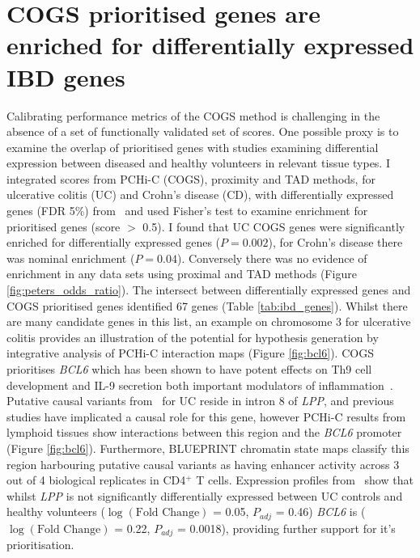 \documentclass[a4paper,11pt]{report}
\begin{document}
\section{COGS prioritised genes are enriched for differentially expressed IBD genes} 
Calibrating performance metrics of the COGS method is challenging in the absence of a set of functionally validated set of scores. One possible proxy is to examine the overlap of prioritised genes with studies examining differential expression between diseased and healthy volunteers in relevant tissue types. I integrated scores from PCHi-C (COGS), proximity and TAD methods, for ulcerative colitis (UC) and Crohn's disease (CD), with differentially expressed genes (FDR 5\%) from~\citet{PetersLyonsLeeEtAl2016} and used Fisher's test to examine enrichment for prioritised genes (score $>$ 0.5). I found that UC COGS genes were significantly enriched for differentially expressed genes ($P = 0.002$), for Crohn's disease there was nominal enrichment ($P = 0.04$). Conversely there was no evidence of enrichment in any data sets using proximal and TAD methods (Figure \ref{fig:peters_odds_ratio}). The intersect between differentially expressed genes and COGS prioritised genes identified 67 genes (Table \ref{tab:ibd_genes}). Whilst there are many candidate genes in this list, an example on chromosome 3 for ulcerative colitis provides an illustration of the potential for hypothesis generation by integrative analysis of PCHi-C interaction maps (Figure \ref{fig:bcl6}). COGS prioritises \textit{BCL6}  which has been shown to have potent effects on Th9 cell development and IL-9 secretion both important modulators of inflammation~\citep{BassilOrentOlahEtAl2014}. Putative causal variants from~\citet{Anderson2011-ch} for UC reside in intron 8 of \textit{LPP}, and previous studies have implicated a causal role for this gene, however PCHi-C results from lymphoid tissues show interactions between this region and the \textit{BCL6} promoter (Figure \ref{fig:bcl6}). Furthermore, BLUEPRINT chromatin state maps classify this region harbouring putative causal variants as having enhancer activity across 3 out of 4 biological replicates in CD4$^+$ T cells. Expression profiles from~\citet{PetersLyonsLeeEtAl2016} show that whilst \textit{LPP} is not significantly differentially expressed between UC controls and healthy volunteers ($\log(\text{Fold Change})$ = 0.05, $P_{adj}$ =  0.46) \textit{BCL6} is ($\log(\text{Fold Change})$ = 0.22, $P_{adj}$ =  0.0018), providing further support for it's prioritisation.
\end{document}
